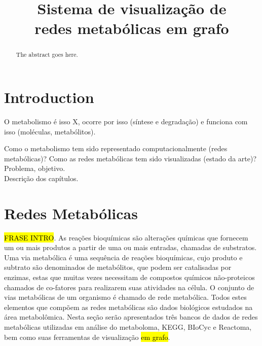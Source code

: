\documentclass[conference]{IEEEtran}
\begin{document}
\title{Sistema de visualização de\\redes metabólicas em grafo}

\author{
}


\maketitle

\begin{abstract}
The abstract goes here.
\end{abstract}


\section{Introduction}

O metabolismo é isso X, ocorre por isso (síntese e degradação) e funciona com isso (moléculas, metabólitos).

Como o metabolismo tem sido representado computacionalmente (redes metabólicas)? Como as redes metabólicas tem sido visualizadas (estado da arte)? \\
Problema, objetivo. \\
Descrição dos capítulos.


\section{Redes Metabólicas}

\hl{FRASE INTRO}. As reações bioquímicas são alterações químicas que fornecem um ou mais produtos a partir de uma ou mais entradas, chamadas de substratos. Uma via metabólica é uma sequência de reações bioquímicas, cujo produto e subtrato são denominados de metabólitos, que podem ser catalisadas por enzimas, estas que muitas vezes necessitam de compostos químicos não-proteicos chamados de co-fatores para realizarem suas atividades na célula. O conjunto de vias metabólicas de um organismo é chamado de rede metabólica. Todos estes elementos que compõem as redes metabólicas são dados biológicos estudados na área metabolômica. Nesta seção serão apresentados três bancos de dados de redes metabólicas utilizadas em análise do metaboloma, KEGG, BIoCyc e Reactoma, bem como suas ferramentas de visualização \hl{em grafo}.
\end{document}
